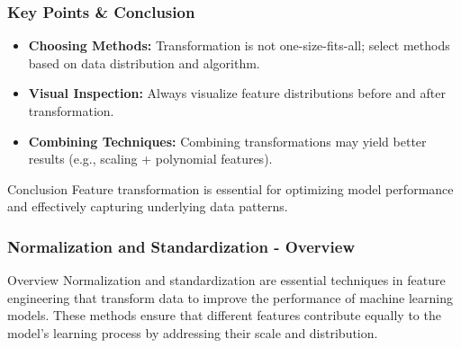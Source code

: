 \documentclass[aspectratio=169]{beamer}
\begin{document}
\begin{frame}[fragile]
  \frametitle{Key Points & Conclusion}
  \begin{itemize}
    \item \textbf{Choosing Methods:}
          Transformation is not one-size-fits-all; select methods based on data distribution and algorithm.
          
    \item \textbf{Visual Inspection:}
          Always visualize feature distributions before and after transformation.
          
    \item \textbf{Combining Techniques:}
          Combining transformations may yield better results (e.g., scaling + polynomial features).
  \end{itemize}
  
  \begin{block}{Conclusion}
    Feature transformation is essential for optimizing model performance and effectively capturing underlying data patterns.
  \end{block}
\end{frame}

\begin{frame}[fragile]
    \frametitle{Normalization and Standardization - Overview}
    \begin{block}{Overview}
        Normalization and standardization are essential techniques in feature engineering that transform data to improve the performance of machine learning models. These methods ensure that different features contribute equally to the model’s learning process by addressing their scale and distribution.
    \end{block}
\end{frame}
\end{document}
